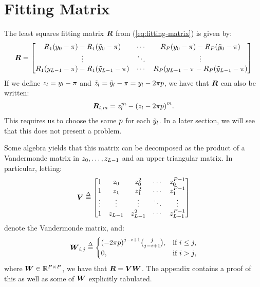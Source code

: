 \section{Fitting Matrix}

The least squares fitting matrix $\boldsymbol{R}$ from
(\ref{eq:fitting-matrix}) is given by:
\begin{align}
  \label{eq:fitting-matrix-explicit}
  \boldsymbol{R} = \begin{bmatrix}
    R_1(y_0 - \pi) - R_1({\tilde{y}}_0 - \pi) & \cdots & R_P(y_0 - \pi) - R_P({\tilde{y}}_0 - \pi) \\
    \vdots & \ddots & \vdots \\
    R_1(y_{L-1} - \pi) - R_1({\tilde{y}}_{L-1} - \pi) & \cdots & R_P(y_{L-1} - \pi - R_P({\tilde{y}}_{L-1} - \pi)
  \end{bmatrix}
\end{align}
If we define $z_l = y_l - \pi$ and
$\tilde{z}_l = {\tilde{y}}_l - \pi = y_l -
2\pi p$, we have that $\boldsymbol{R}$ can also be written:
\begin{align}
  \label{eq:fitting-matrix-with-shifted-arg}
  \boldsymbol{R}_{l,m} = z_l^m - {(z_l - 2\pi p)}^m.
\end{align}
This requires us to choose the same $p$ for each
${\tilde{y}}_l$. In a later section, we will see that this does
not present a problem.

Some algebra yields that this matrix can be decomposed as the product
of a Vandermonde matrix in $z_0, \hdots, z_{L - 1}$
and an upper triangular matrix. In particular, letting:
\begin{align}
  \label{eq:vandermonde-factor-of-R}
  \boldsymbol{V} \overset{\Delta}{=} \begin{bmatrix}
    1 & z_0 & z_0^2 & \cdots & z_0^{P - 1} \\
    1 & z_1 & z_1^2 & \cdots & z_1^{P - 1} \\
    \vdots & \vdots & \vdots & \ddots & \vdots \\
    1 & z_{L-1} & z_{L-1}^2 & \cdots & z_{L-1}^{P-1}
  \end{bmatrix}
\end{align}
denote the Vandermonde matrix, and:
\begin{align}
  \label{eq:upper-tri-factor-of-R}
  \boldsymbol{W}_{i,j} \overset{\Delta}{=} \begin{cases}
    {(-2\pi p)}^{j-i+1} {j \choose j - i + 1}, & \mbox{if } i \leq j, \\
    0, & \mbox{if } i > j, \\
  \end{cases}
\end{align}
where $\boldsymbol{W} \in \mathbb{R}^{P\times P}$, we have
that $\boldsymbol{R} = \boldsymbol{V}\boldsymbol{W}$. The appendix
contains a proof of this as well as some of $\boldsymbol{W}$
explicitly tabulated.

